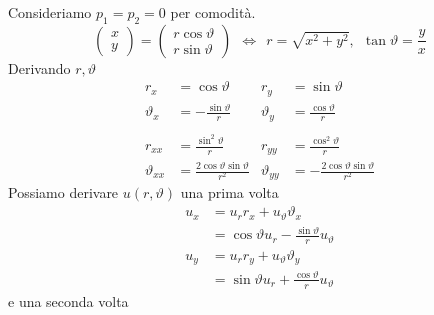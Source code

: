 Consideriamo $p_{1} =p_{2} =0$ per comodità.
\begin{equation*}
    \begin{pmatrix}
        x \\
        y
    \end{pmatrix} =
    \begin{pmatrix}
        r\cos \vartheta \\
        r\sin \vartheta
    \end{pmatrix} \ \ \Leftrightarrow \ \ r=\sqrt{x^{2} +y^{2}},\ \ \tan \vartheta =\frac{y}{x}
\end{equation*}
Derivando $r,\vartheta $
\begin{align*}
    r_{x}           & =\cos \vartheta                                & r_{y}           & =\sin \vartheta                                 \\
    \vartheta _{x}  & =-\frac{\sin \vartheta }{r}                    & \vartheta _{y}  & =\frac{\cos \vartheta }{r}                      \\
                    &                                                &                 &                                                 \\
    r_{xx}          & =\frac{\sin^{2} \vartheta }{r}                 & r_{yy}          & =\frac{\cos^{2} \vartheta }{r}                  \\
    \vartheta _{xx} & =\frac{2\cos \vartheta \sin \vartheta }{r^{2}} & \vartheta _{yy} & =-\frac{2\cos \vartheta \sin \vartheta }{r^{2}}
\end{align*}
Possiamo derivare $u(r,\vartheta)$ una prima volta
\begin{equation*}
    \begin{aligned}
        u_{x} & =u_{r} r_{x} +u_{\vartheta } \vartheta _{x}                     \\
              & =\cos \vartheta u_{r} -\frac{\sin \vartheta }{r} u_{\vartheta } \\
        u_{y} & =u_{r} r_{y} +u_{\vartheta } \vartheta _{y}                     \\
              & =\sin \vartheta u_{r} +\frac{\cos \vartheta }{r} u_{\vartheta }
    \end{aligned}
\end{equation*}
e una seconda volta
